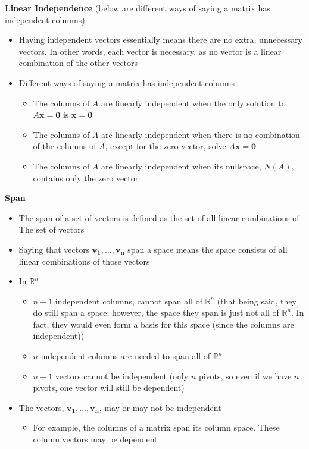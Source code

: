 \documentclass[11pt]{article}
\begin{document}
\textbf{Linear Independence} (below are different ways of saying a matrix has independent 
columns)
\begin{itemize}
    \item Having independent vectors essentially means there are no extra, unnecessary vectors.
    In other words, each vector is necessary, as no vector is a linear combination of the other
    vectors
    \item Different ways of saying a matrix has independent columns
    \begin{itemize}
        \item The columns of $A$ are linearly independent when the only solution to $A
        \boldsymbol{x} = \boldsymbol{0}$ is $\boldsymbol{x} = \boldsymbol{0}$
        \item The columns of $A$ are linearly independent when there is no combination of the 
        columns of $A$, except for the zero vector, solve 
        $A\boldsymbol{x} = \boldsymbol{0}$
        \item The columns of $A$ are linearly independent when its nullspace, $N(A)$, contains 
        only the zero vector
    \end{itemize}
\end{itemize}

\textbf{Span}
\begin{itemize}
    \item The span of a set of vectors is defined as the set of all linear combinations of The
    set of vectors
    \item Saying that vectors $\boldsymbol{v_1}, \ldots, \boldsymbol{v_n}$ span a space means 
    the space consists of all linear combinations of those vectors
    \item In $\mathbb{R}^n$
    \begin{itemize}
        \item $n-1$ independent columns, cannot span all of $\mathbb{R}^n$ (that being said, 
        they do still span a space; however, the space they span is just not all of 
        $\mathbb{R}^n$. In fact, they would even form a basis for this space (since the columns
        are independent))
        \item $n$ independent columns are needed to span all of $\mathbb{R}^n$
        \item $n+1$ vectors cannot be independent (only $n$ pivots, so even if we have $n$ 
        pivots, one vector will still be dependent)
    \end{itemize}
    \item The vectors, $\boldsymbol{v_1}, \ldots, \boldsymbol{v_n}$, may or may not be 
    independent
    \begin{itemize}
        \item For example, the columns of a matrix span its column space. These column vectors
        may be dependent
    \end{itemize}
\end{itemize}
\end{document}
